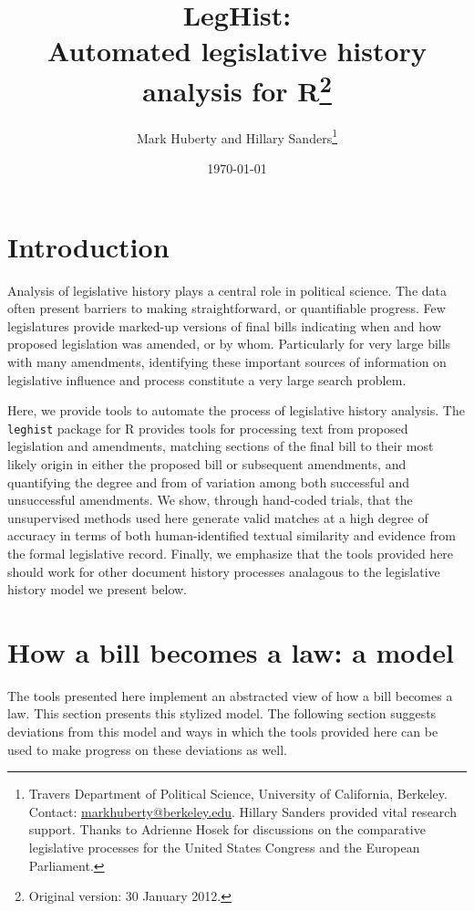 \documentclass[11pt]{article}
\title{LegHist:\\ Automated legislative history analysis for
  R\thanks{Original version: 30 January 2012.}}
\author{Mark Huberty and Hillary Sanders\thanks{Travers Department of Political Science,
    University of California, Berkeley. Contact:
    \url{markhuberty@berkeley.edu}. Hillary Sanders provided vital
    research support. Thanks to Adrienne Hosek for discussions on the
  comparative legislative processes for the United States Congress and
the European Parliament.}}
\date{\today}
\begin{document}
%
\maketitle

\begin{abstract}
  
\end{abstract}

\section{Introduction}
\label{sec:introduction}

Analysis of legislative history plays a central role in political
science. The data often present barriers to making straightforward, or
quantifiable progress. Few legislatures provide marked-up versions of final bills
indicating when and how proposed legislation was amended, or by
whom. Particularly for very large bills with many amendments,
identifying these important sources of information on legislative
influence and process constitute a very large search problem. 

Here, we provide tools to automate the process of legislative history
analysis. The \texttt{leghist} package for R provides tools for
processing text from proposed legislation and amendments, matching
sections of the final bill to their most likely origin in either the
proposed bill or subsequent amendments, and quantifying the degree and
from of variation among both successful and unsuccessful
amendments. We show, through hand-coded trials, that the unsupervised
methods used here generate valid matches at a high degree of accuracy
in terms of both human-identified textual similarity and evidence from
the formal legislative record. Finally, we emphasize that the tools
provided here should work for other document history processes
analagous to the legislative history model we present below.

\section{How a bill becomes a law: a model}
\label{sec:how-bill-becomes}

The tools presented here implement an abstracted view of how a bill
becomes a law. This section presents this stylized model. The
following section suggests deviations from this model and ways in
which the tools provided here can be used to make progress on these
deviations as well. 
\end{document}
